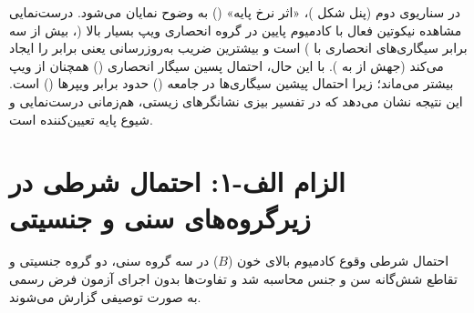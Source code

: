 \documentclass[12pt]{exam}
\begin{document}
در سناریوی دوم (پنل  شکل )، «اثر نرخ پایه» () به وضوح نمایان می‌شود. درست‌نمایی مشاهده نیکوتین فعال با کادمیوم پایین در گروه انحصاری ویپ بسیار بالا (، بیش از سه برابر سیگاری‌های انحصاری با ) است و بیشترین ضریب به‌روزرسانی یعنی  برابر را ایجاد می‌کند (جهش از  به ). با این حال، احتمال پسین سیگار انحصاری () همچنان از ویپ بیشتر می‌ماند؛ زیرا احتمال پیشین سیگاری‌ها در جامعه () حدود  برابر ویپرها () است. این نتیجه نشان می‌دهد که در تفسیر بیزی نشانگرهای زیستی، هم‌زمانی درست‌نمایی و شیوع پایه تعیین‌کننده است.


\section{الزام الف-۱: احتمال شرطی در زیرگروه‌های سنی و جنسیتی}

احتمال شرطی وقوع کادمیوم بالای خون ($B$) در سه گروه سنی، دو گروه جنسیتی و تقاطع شش‌گانه سن و جنس محاسبه شد و تفاوت‌ها بدون اجرای آزمون فرض رسمی به صورت توصیفی گزارش می‌شوند.

\begin{table}[htbp]
\centering
\caption{احتمال شرطی کادمیوم بالای خون ($B$) و سهم سیگاری‌های احتراقی ($A$) در زیرگروه‌های سنی و جنسیتی}
\end{table}
\end{document}
